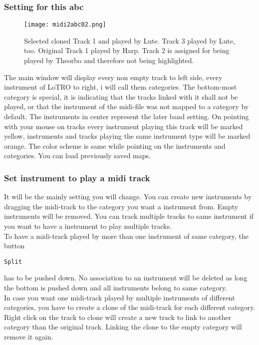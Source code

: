 \documentclass[10pt,a4paper,oneside]{article}
\begin{document}
\subsubsection{Setting for this abc}
\begin{wrapfigure}{R}{0.55\textwidth}
\texttt{[image: midi2abc02.png]}
\caption{Selected cloned Track 1 and played by Lute. Track 3 played by Lute, too. Original Track 1 played by Harp. Track 2 is assigned for being played by Theorbo and therefore not being highlighted.}
\end{wrapfigure}
The main window will display every non empty track to left side, every instrument of LoTRO to right, i will call them categories.
The bottom-most category is special, it is indicating that the tracks linked with it shall not be played, or that the instrument of the midi-file was not mapped to a category by default. The instruments in center represent the later band setting. On pointing with your mouse on tracks every instrument playing this track will be marked yellow, instruments and tracks playing the same instrument type will be marked orange. The color scheme is same while pointing on the instruments and categories. You can load previously saved maps.

\subsubsection{Set instrument to play a midi track} 
It will be the mainly setting you will change. You can create new instruments by dragging the midi-track to the category you want a instrument from. Empty instruments will be removed. You can track multiple tracks to same instrument if you want to have a instrument to play multiple tracks.\\
To have a midi-track played by more than one instrument of same category, the button 
\begin{verbatim}
Split
\end{verbatim} has to be pushed down. No association to an instrument will be deleted as long the bottom is pushed down and all instruments belong to same category.\\
In case you want one midi-track played by multiple instruments of different categories, you have to create a clone of the midi-track for each different category. Right click on the track to clone will create a new track to link to another category than the original track. Linking the clone to the empty category will remove it again. 
\end{document}
